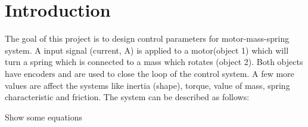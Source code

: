 \section{Introduction}
The goal of this project is to design control parameters for motor-mass-spring system. A input signal (current, A) is applied to a motor(object 1) which will turn a spring which is connected to a mass which rotates (object 2). Both objects have encoders and are used to close the loop of the control system. A few more values are affect the systems like inertia (shape), torque, value of mass, spring characteristic and friction. The system can be described as follows:



\color{red}
Show some equations 
\color{black}

	
